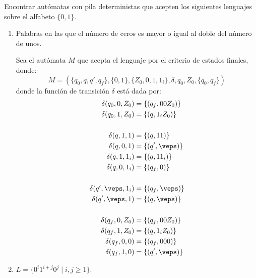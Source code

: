 \documentclass[12pt]{article}
\begin{document}
    \begin{ejercicio}[2.5 puntos]
        Encontrar autómatas con pila deterministas que acepten los siguientes lenguajes sobre el alfabeto $\{0, 1\}$.
        \begin{enumerate}
            \item Palabras en las que el número de ceros es mayor o igual al doble del número de unos.
            
            Sea el autómata $M$ que acepta el lenguaje por el criterio de estados finales, donde:
            \begin{equation*}
                M=(\{q_0,q,q',q_f\},\{0,1\},\{Z_0,0,1,1_i\},\delta,q_0,Z_0,\{q_0,q_f\})
            \end{equation*}
            donde la función de transición $\delta$ está dada por:
            \begin{align*}
                \delta(q_0,0,Z_0)&=\{(q_f,00Z_0)\}\\
                \delta(q_0,1,Z_0)&=\{(q,1_iZ_0)\}\\\\
                \delta(q,1,1)&=\{(q,11)\}\\
                \delta(q,0,1)&=\{(q',\veps)\}\\
                \delta(q,1,1_i)&=\{(q,11_i)\}\\
                \delta(q,0,1_i)&=\{(q_f,0)\}\\ \\
                \delta(q',\veps,1_i)&=\{(q_f,\veps)\} \\
                \delta(q',\veps,1)&=\{(q,\veps)\}\\\\
                \delta(q_f,0,Z_0)&=\{(q_f,00Z_0)\} \\
                \delta(q_f,1,Z_0)&=\{(q,1_iZ_0)\}\\
                \delta(q_f,0,0)&=\{(q_f,000)\}\\
                \delta(q_f,1,0)&=\{(q',\veps)\}
            \end{align*}
            \item $L = \{0^{i}1^{i+j}0^j \mid i, j \geq 1\}$.
            

\end{enumerate}
\end{ejercicio}
\end{document}
